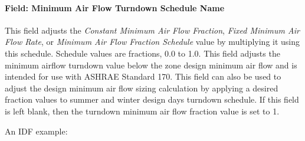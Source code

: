 \paragraph{Field: Minimum Air Flow Turndown Schedule Name}

This field adjusts the \textit{Constant Minimum Air Flow Fraction}, \textit{Fixed Minimum Air Flow Rate}, or \textit{Minimum Air Flow Fraction Schedule} value by multiplying it using this schedule. Schedule values are fractions, 0.0 to 1.0. This field adjusts the minimum airflow turndown value below the zone design minimum air flow and is intended for use with ASHRAE Standard 170. This field can also be used to adjust the design minimum air flow sizing calculation by applying a desired fraction values to summer and winter design days turndown schedule. If this field is left blank, then the turndown minimum air flow fraction value is set to 1.

An IDF example:

